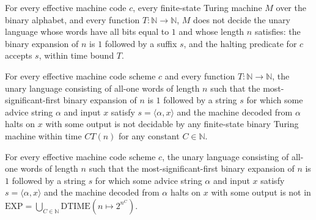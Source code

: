 \begin{theorem}
\label{Complexity.not_decidesInTime_UHALT}
\leanok
{}
For every effective machine code $c$, every finite-state Turing machine $M$ over the
binary alphabet, and every function $T:\mathbb{N}\to\mathbb{N}$, $M$ does not decide the
unary language whose words have all bits equal to $1$ and whose length $n$ satisfies:
the binary expansion of $n$ is $1$ followed by a suffix $s$, and the halting predicate
for $c$ accepts $s$, within time bound $T$.
\end{theorem}

\begin{theorem}
\label{Complexity.UHALT_not_mem_DTIME}
\leanok
{}
For every effective machine code scheme $c$ and every function
$T\colon\mathbb{N}\to\mathbb{N}$, the unary language consisting of all-one words of
length $n$ such that the most-significant-first binary expansion of $n$ is $1$ followed
by a string $s$ for which some advice string $\alpha$ and input $x$ satisfy
$s=\langle\alpha,x\rangle$ and the machine decoded from $\alpha$ halts on $x$ with some
output is not decidable by any finite-state binary Turing machine within time $C T(n)$
for any constant $C\in\mathbb{N}$.
\end{theorem}

\begin{theorem}
\label{Complexity.UHALT_not_mem_EXP}
\leanok
{}
For every effective machine code scheme $c$, the unary language consisting of all-one
words of length $n$ such that the most-significant-first binary expansion of $n$ is $1$
followed by a string $s$ for which some advice string $\alpha$ and input $x$ satisfy
$s=\langle\alpha,x\rangle$ and the machine decoded from $\alpha$ halts on $x$ with some
output is not in $\mathrm{EXP}=\bigcup_{C\in\mathbb{N}}\mathrm{DTIME}(n\mapsto
2^{n^C})$.
\end{theorem}

